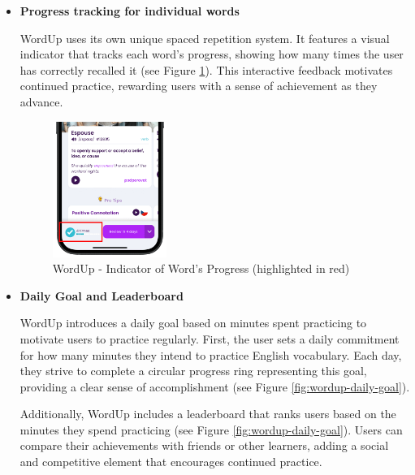 \begin{itemize}
    \item \textbf{Progress tracking for individual words}
    \label{sec:wordup-individual-word-progress-experience}
    
    WordUp uses its own unique spaced repetition system. It features a visual indicator that tracks each word's progress, showing how many times the user has correctly recalled it (see Figure \ref{fig:wordup-word-progress}). This interactive feedback motivates continued practice, rewarding users with a sense of achievement as they advance.

    \begin{figure}[!h]
        \includegraphics[width=0.35\textwidth]{src/figures/wordup-word-progress.png}
        \caption{WordUp - Indicator of Word's Progress (highlighted in red)}
        \label{fig:wordup-word-progress}
    \end{figure}

    \item \textbf{Daily Goal and Leaderboard}

    WordUp introduces a daily goal based on minutes spent practicing to motivate users to practice regularly. First, the user sets a daily commitment for how many minutes they intend to practice English vocabulary. Each day, they strive to complete a circular progress ring representing this goal, providing a clear sense of accomplishment (see Figure \ref{fig:wordup-daily-goal}).
    
    Additionally, WordUp includes a leaderboard that ranks users based on the minutes they spend practicing (see Figure \ref{fig:wordup-daily-goal}). Users can compare their achievements with friends or other learners, adding a social and competitive element that encourages continued practice. 


\end{itemize}
